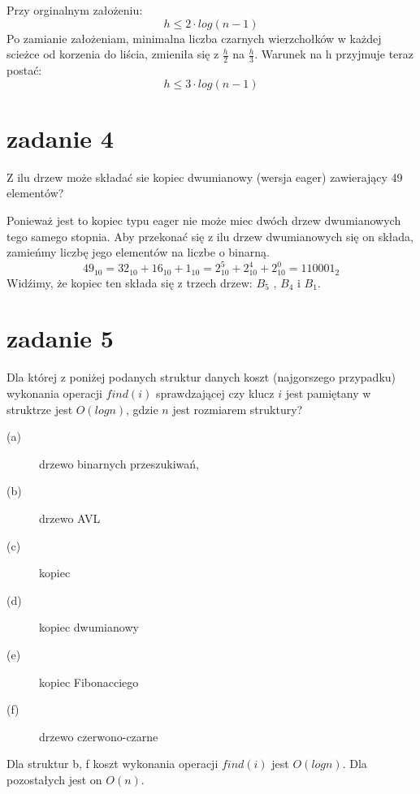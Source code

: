 \documentclass[svgnames]{report}
\begin{document}
Przy orginalnym założeniu:
\begin{equation*}
h \leqslant 2 \cdot log(n-1)
\end{equation*}
Po zamianie założeniam, minimalna liczba czarnych wierzchołków w każdej scieżce od korzenia do liścia, zmieniła się z $\frac{h}{2}$ na $\frac{h}{3}$. Warunek na h przyjmuje teraz postać:
\begin{equation*}
h \leqslant 3 \cdot log(n-1)
\end{equation*}


\section{zadanie 4}
\begin{framed}
Z ilu drzew może składać sie kopiec dwumianowy (wersja eager) zawierający 49 elementów?
\end{framed}
Ponieważ jest to kopiec typu eager nie może miec dwóch drzew dwumianowych tego samego stopnia.
Aby przekonać się z ilu drzew dwumianowych się on składa, zamieńmy liczbę jego elementów na liczbe o binarną.
\begin{equation}
49_{10} = 32_{10} + 16_{10} + 1_{10} = 2_{10}^5 + 2_{10}^4 + 2_{10}^0 = 110001_2
\end{equation} 
Widźimy, że kopiec ten składa się z trzech drzew: $B_5$ , $B_4$ i $B_1$.


\section{zadanie 5}
\begin{framed}
Dla której z poniżej podanych struktur danych koszt (najgorszego przypadku) wykonania operacji $find(i)$ sprawdzającej czy klucz $i$ jest pamiętany w struktrze jest $O(log n)$, gdzie $n$ jest rozmiarem struktury?
\begin{description}
	\item[(a)] drzewo binarnych przeszukiwań,
	\item[(b)] drzewo AVL
	\item[(c)] kopiec
	\item[(d)] kopiec dwumianowy
	\item[(e)] kopiec Fibonacciego
	\item[(f)] drzewo czerwono-czarne
\end{description}
\end{framed}
Dla struktur b, f koszt wykonania operacji $find(i)$ jest $O(log n)$.
Dla pozostałych jest on $O(n)$.
\end{document}
